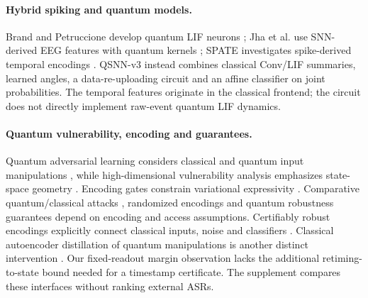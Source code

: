 \paragraph{Hybrid spiking and quantum models.}
Brand and Petruccione develop quantum LIF neurons \cite{brand2024}; Jha et al. use SNN-derived EEG features with quantum kernels \cite{jha2025hybrid}; SPATE investigates spike-derived temporal encodings \cite{spate2026}. QSNN-v3 instead combines classical Conv/LIF summaries, learned angles, a data-re-uploading circuit \cite{perez2020} and an affine classifier on joint probabilities. The temporal features originate in the classical frontend; the circuit does not directly implement raw-event quantum LIF dynamics.

\paragraph{Quantum vulnerability, encoding and guarantees.}
Quantum adversarial learning considers classical and quantum input manipulations \cite{lu2020quantumadv}, while high-dimensional vulnerability analysis emphasizes state-space geometry \cite{liu2020vulnerability}. Encoding gates constrain variational expressivity \cite{schuld2021encoding}. Comparative quantum/classical attacks \cite{wendlinger2024comparative}, randomized encodings \cite{gong2024randomized} and quantum robustness guarantees \cite{dowling2026guarantees} depend on encoding and access assumptions. Certifiably robust encodings explicitly connect classical inputs, noise and classifiers \cite{saxena2024encoding}. Classical autoencoder distillation of quantum manipulations is another distinct intervention \cite{khatun2025distillation}. Our fixed-readout margin observation lacks the additional retiming-to-state bound needed for a timestamp certificate. The supplement compares these interfaces without ranking external ASRs.
